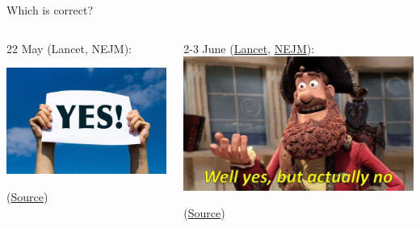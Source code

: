\documentclass{beamer}
\begin{document}
\begin{frame}{Which is correct?}
\begin{columns}
\begin{column}{.5\textwidth}
22 May (Lancet, NEJM):

\includegraphics[trim=0 7mm 0 9mm,clip, width=\linewidth]{images/yes}

(\href{https://www.theguardian.com/world/2020/jun/03/covid-19-surgisphere-who-world-health-organization-hydroxychloroquine}{Source})
\end{column}

\begin{column}{.5\textwidth}
2-3 June (\href{https://www.thelancet.com/journals/lanpub/article/PIIS0140-6736(20)31290-3/fulltext}{Lancet}, \href{https://www.nejm.org/doi/full/10.1056/NEJMe2020822?query=featured\%E2\%80\%94coronavirus}{NEJM}):
\includegraphics[width=\linewidth]{images/actually}

(\href{https://www.theguardian.com/world/2020/jun/03/how-were-medical-journals-and-who-caught-out-over-hydroxychloroquine}{Source})
\end{column}
\end{columns}

\end{frame}
\end{document}
